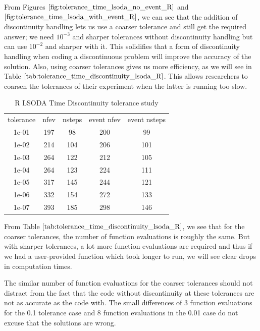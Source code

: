From Figures $\ref{fig:tolerance_time_lsoda_no_event_R}$ and $\ref{fig:tolerance_time_lsoda_with_event_R}$, we can see that the addition of discontinuity handling lets us use a coarser tolerance and still get the required answer; we need $10^{-3}$ and sharper tolerances without discontinuity handling but can use $10^{-2}$ and sharper with it. This solidifies that a form of discontinuity handling when coding a discontinuous problem will improve the accuracy of the solution. Also, using coarser tolerances gives us more efficiency, as we will see in Table $\ref{tab:tolerance_time_discontinuity_lsoda_R}$. This allows researchers to coarsen the tolerances of their experiment when the latter is running too slow.

\begin{table}[h]
\caption {R LSODA Time Discontinuity tolerance study} \label{tab:tolerance_time_discontinuity_lsoda_R} 
\begin{center}
\begin{tabular}{ c c c c c }
tolerance & nfev & nsteps & event nfev & event nsteps \\ 
1e-01 & 197 &  98 & 200 &  99 \\
1e-02 & 214 & 104 & 206 & 101 \\
1e-03 & 264 & 122 & 212 & 105 \\
1e-04 & 264 & 123 & 224 & 111 \\
1e-05 & 317 & 145 & 244 & 121 \\
1e-06 & 332 & 154 & 272 & 133 \\
1e-07 & 393 & 185 & 298 & 146 \\
\end{tabular}
\end{center}
\end{table}

From Table $\ref{tab:tolerance_time_discontinuity_lsoda_R}$, we see that for the coarser tolerances, the number of function evaluations is roughly the same. But with sharper tolerances, a lot more function evaluations are required and thus if we had a user-provided function which took longer to run, we will see clear drops in computation times.

The similar number of function evaluations for the coarser tolerances should not distract from the fact that the code without discontinuity at these tolerances are not as accurate as the code with. The small differences of 3 function evaluations for the 0.1 tolerance case and 8 function evaluations in the 0.01 case do not excuse that the solutions are wrong.

